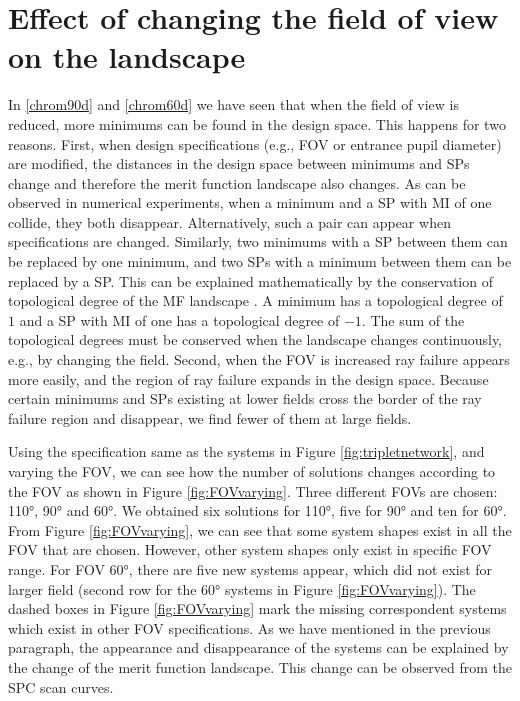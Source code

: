 \section{Effect of changing the field of view on the landscape}
In \ref{chrom90d} and \ref{chrom60d} we have seen that when the field of view is reduced, more minimums can be found in the design space. This happens for two reasons. First, when design specifications (e.g., FOV or entrance pupil diameter) are modified, the distances in the design space between minimums and SPs change
and therefore the merit function landscape also changes. As can be observed in numerical experiments, when a minimum and a SP with MI of one collide, they both disappear. Alternatively, such a pair can appear when specifications are changed. Similarly, two minimums with a SP between them can be replaced by one minimum, and two SPs with a minimum between them can be replaced by a SP. This can be explained mathematically by the conservation of topological degree of the MF landscape \cite{vanTurnhoutThesis2009}. A minimum has a topological degree of $1$ and a SP with MI of one has a topological degree of $-1$. The sum of the topological degrees must be conserved when the landscape changes continuously, e.g., by changing the field. Second, when the FOV is increased ray failure appears more easily, and the region of ray failure expands in the design space. Because certain minimums and SPs existing at lower fields cross the border of the ray failure region and disappear, we find fewer of them at large fields.

Using the specification same as the systems in Figure \ref{fig:tripletnetwork}, and varying the FOV, we can see how the number of solutions changes according to the FOV as shown in Figure \ref{fig:FOVvarying}. Three different FOVs are chosen: 110°, 90° and 60°. We obtained six solutions for 110°, five for 90° and ten for 60°. From Figure \ref{fig:FOVvarying}, we can see that some system shapes exist in all the FOV that are chosen. However, other system shapes only exist in specific FOV range.
For FOV 60°, there are five new systems appear, which did not exist for larger field (second row for the 60° systems in Figure \ref{fig:FOVvarying}). The dashed boxes in Figure \ref{fig:FOVvarying} mark the missing correspondent systems which exist in other FOV specifications. As we have mentioned in the previous paragraph, the appearance and disappearance of the systems can be explained by the change of the merit function landscape. This change can be observed from the SPC scan curves.  

